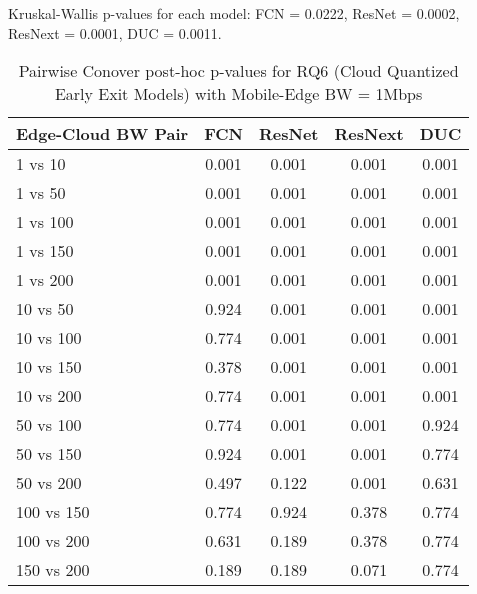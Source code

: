 \begin{table}[h]
\centering
\caption{Pairwise Conover post-hoc p-values for RQ6 (Cloud Quantized Early Exit Models) with Mobile-Edge BW = 1Mbps}
\label{tab:conover_cloud_quantized_earlyexit_me1}
\smallskip
Kruskal-Wallis p-values for each model: FCN = 0.0222, ResNet = 0.0002, ResNext = 0.0001, DUC = 0.0011.

\begin{tabular}{lcccc}
\toprule
Edge-Cloud BW Pair & FCN & ResNet & ResNext & DUC \\
\midrule
1 vs 10 & 0.001 & 0.001 & 0.001 & 0.001 \\
1 vs 50 & 0.001 & 0.001 & 0.001 & 0.001 \\
1 vs 100 & 0.001 & 0.001 & 0.001 & 0.001 \\
1 vs 150 & 0.001 & 0.001 & 0.001 & 0.001 \\
1 vs 200 & 0.001 & 0.001 & 0.001 & 0.001 \\
10 vs 50 & 0.924 & 0.001 & 0.001 & 0.001 \\
10 vs 100 & 0.774 & 0.001 & 0.001 & 0.001 \\
10 vs 150 & 0.378 & 0.001 & 0.001 & 0.001 \\
10 vs 200 & 0.774 & 0.001 & 0.001 & 0.001 \\
50 vs 100 & 0.774 & 0.001 & 0.001 & 0.924 \\
50 vs 150 & 0.924 & 0.001 & 0.001 & 0.774 \\
50 vs 200 & 0.497 & 0.122 & 0.001 & 0.631 \\
100 vs 150 & 0.774 & 0.924 & 0.378 & 0.774 \\
100 vs 200 & 0.631 & 0.189 & 0.378 & 0.774 \\
150 vs 200 & 0.189 & 0.189 & 0.071 & 0.774 \\
\bottomrule
\end{tabular}
\end{table}

